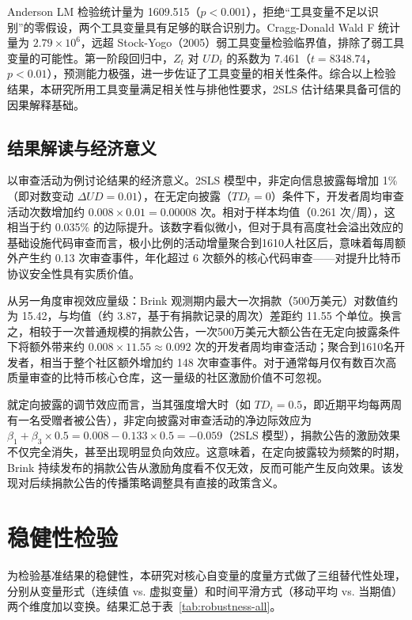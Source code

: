 Anderson LM 检验统计量为 1609.515（$p < 0.001$），拒绝“工具变量不足以识别”的零假设，两个工具变量具有足够的联合识别力。Cragg-Donald Wald F 统计量为 $2.79 \times 10^6$，远超 Stock-Yogo（2005）\cite{stock2005testing}弱工具变量检验临界值，排除了弱工具变量的可能性。第一阶段回归中，$Z_t$ 对 $UD_t$ 的系数为 7.461（$t = 8348.74$，$p < 0.01$），预测能力极强，进一步佐证了工具变量的相关性条件。综合以上检验结果，本研究所用工具变量满足相关性与排他性要求，2SLS 估计结果具备可信的因果解释基础。

\subsection{结果解读与经济意义}

以审查活动为例讨论结果的经济意义。2SLS 模型中，非定向信息披露每增加 1\%（即对数变动 $\Delta UD = 0.01$），在无定向披露（$TD_t = 0$）条件下，开发者周均审查活动次数增加约 $0.008 \times 0.01 = 0.00008$ 次。相对于样本均值（0.261 次/周），这相当于约 0.035\% 的边际提升。该数字看似微小，但对于具有高度社会溢出效应的基础设施代码审查而言，极小比例的活动增量聚合到1610人社区后，意味着每周额外产生约 0.13 次审查事件，年化超过 6 次额外的核心代码审查——对提升比特币协议安全性具有实质价值。

从另一角度审视效应量级：Brink 观测期内最大一次捐款（500万美元）对数值约为 15.42，与均值（约 3.87，基于有捐款记录的周次）差距约 11.55 个单位。换言之，相较于一次普通规模的捐款公告，一次500万美元大额公告在无定向披露条件下将额外带来约 $0.008 \times 11.55 \approx 0.092$ 次的开发者周均审查活动；聚合到1610名开发者，相当于整个社区额外增加约 148 次审查事件。对于通常每月仅有数百次高质量审查的比特币核心仓库，这一量级的社区激励价值不可忽视。

就定向披露的调节效应而言，当其强度增大时（如 $TD_t = 0.5$，即近期平均每两周有一名受赠者被公告），非定向披露对审查活动的净边际效应为 $\beta_1 + \beta_3 \times 0.5 = 0.008 - 0.133 \times 0.5 = -0.059$（2SLS 模型），捐款公告的激励效果不仅完全消失，甚至出现明显负向效应。这意味着，在定向披露较为频繁的时期，Brink 持续发布的捐款公告从激励角度看不仅无效，反而可能产生反向效果。该发现对后续捐款公告的传播策略调整具有直接的政策含义。

\section{稳健性检验}
\label{sec:robust-1}

为检验基准结果的稳健性，本研究对核心自变量的度量方式做了三组替代性处理，分别从变量形式（连续值 vs. 虚拟变量）和时间平滑方式（移动平均 vs. 当期值）两个维度加以变换。结果汇总于表~\ref{tab:robustness-all}。

